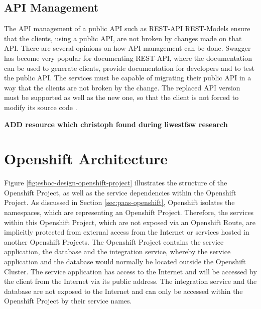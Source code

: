 \subsection{API Management}
\label{sec:esboc-requirements-service-api}
The API management of a public API such as REST-API REST-Models ensure that the clients, using a public API, are not broken by changes made on that API. There are several opinions on how API management can be done. Swagger has become very popular for documenting REST-API, where the documentation can be used to generate clients, provide documentation for developers and to test the public API. The services must be capable of migrating their public API in a way that the clients are not broken by the change. The replaced API version must be supported as well as the new one, so that the client is not forced to modify its source code \cite{SmartBearSwagger2018}.

\textbf{ADD resource which christoph found during liwestfsw research} 
\section{Openshift Architecture}
\label{sec:esboc-design-oc}
Figure \vref{fig:esboc-design-openshift-project} illustrates the structure of the Openshift Project, as well as the service dependencies within the Openshift Project. As discussed in Section \vref{sec:paas-openshift}, Openshift isolates the namespaces, which are representing an Openshift Project. Therefore, the services within this Openshift Project, which are not exposed via an Openshift Route, are implicitly protected from external access from the Internet or services hosted in another Openshift Projects. The Openshift Project contains the service application, the database and the integration service, whereby the service application and the database would normally be located outside the Openshift Cluster. The service application has access to the Internet and will be accessed by the client from the Internet via its public address. The integration service and the database are not exposed to the Internet and can only be accessed within the Openshift Project by their service names.

